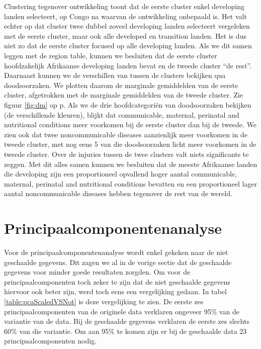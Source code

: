 \documentclass[a4paper,kulak]{kulakarticle}
\begin{document}
Clustering tegenover ontwikkeling toont dat de eerste cluster enkel developing landen selecteert, op Congo na waarvan de ontwikkeling onbepaald is.
Het valt echter op dat cluster twee dubbel zoveel developing landen selecteert vergeleken met de eerste cluster, maar ook alle developed en transition landen.
Het is dus niet zo dat de eerste cluster focused op alle developing landen.
Als we dit samen leggen met de region table, kunnen we besluiten dat de eerste cluster hoofdzakelijk Afrikaanse developing landen bevat en de tweede cluster ``de rest''. \newline
Daarnaast kunnen we de verschillen van tussen de clusters bekijken qua doodsoorzaken.
We plotten daarom de marginale gemiddelden van de eerste cluster, afgetrokken met de marginale gemiddelden van de tweede cluster.
Zie figuur \ref{fig:dm} op p\pageref{fig:dm}.
Als we de drie hoofdcategoriën van doodsoorzaken bekijken (de verschillende kleuren), blijkt dat communicable, maternal, perinatal and nutritional conditions meer voorkomen bij de eerste cluster dan bij de tweede.
We zien ook dat twee noncommunicable diseases aanzienlijk meer voorkomen in de tweede cluster, met nog eens 5 van die doodsoorzaken licht meer voorkomen in de tweede cluster.
Over de injuries tussen de twee clusters valt niets significants te zeggen. \newline
Met dit alles samen kunnen we besluiten dat de meeste Afrikaanse landen die developing zijn een proportioneel opvallend hoger aantal  communicable, maternal, perinatal and nutritional conditions bevatten en een proportioneel lager aantal noncommunicable diseases hebben tegenover de rest van de wereld.


\section{Principaalcomponentenanalyse}

Voor de principaalcomponentenanalyse wordt enkel gekeken naar de niet geschaalde gegevens. Dit zagen we al in de vorige sectie dat de geschaalde gegevens voor minder goede resultaten zorgden. Om voor de principaalcomponenten toch zeker te zijn dat de niet geschaalde gegevens hiervoor ook beter zijn, werd toch eens een vergelijking gedaan. In tabel \ref{table:pcaScaledVSNot} is deze vergelijking te zien. De eerste zes principaalcomponenten van de originele data verklaren ongeveer 95\% van de variantie van de data. Bij de geschaalde gegevens verklaren de eerste zes slechts 60\% van die variantie. Om aan 95\% te komen zijn er bij de geschaalde data 23 principaalcomponenten nodig. 
\end{document}
